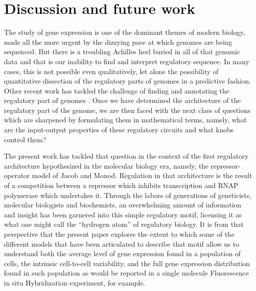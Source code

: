 \section{Discussion and future work}

The study of gene expression is one of the dominant themes of modern biology,
made all the more urgent by the dizzying pace at which genomes are being
sequenced. But there is a troubling Achilles heel buried in all of that genomic
data and that is our inability to find and interpret regulatory sequence. In
many cases, this is not possible even qualitatively, let alone the possibility
of quantitative dissection of the regulatory parts of genomes in a predictive
fashion. Other recent work has tackled the challenge of finding and annotating
the regulatory part of genomes \cite{Belliveau2018, Ireland2020} . Once we have determined the architecture of the
regulatory part of the genome, we are then faced with the next class of
questions which are sharpened by formulating them in mathematical terms, namely,
what are the input-output properties of these regulatory circuits and what knobs
control them?

The present work has tackled that question in the context of the first
regulatory architecture hypothesized in the molecular biology era, namely, the
repressor-operator model of Jacob and Monod. Regulation in that architecture is
the result of a competition between a repressor which inhibits transcription and
RNAP polymerase which undertakes it. Through the labors of generations of
geneticists, molecular biologists and biochemists, an overwhelming amount of
information and insight has been garnered into this simple regulatory motif,
licensing it as what one might call the ``hydrogen atom'' of regulatory biology.
It is from that perspective that the present paper explores the extent to which
some of the different models that have been articulated to describe that motif
allow us to understand both the average level of gene expression found in a
population of cells, the intrinsic cell-to-cell variability, and the full gene
expression distribution found in such population as would be reported in a
single molecule Fluorescence in situ Hybridization experiment, for example.

